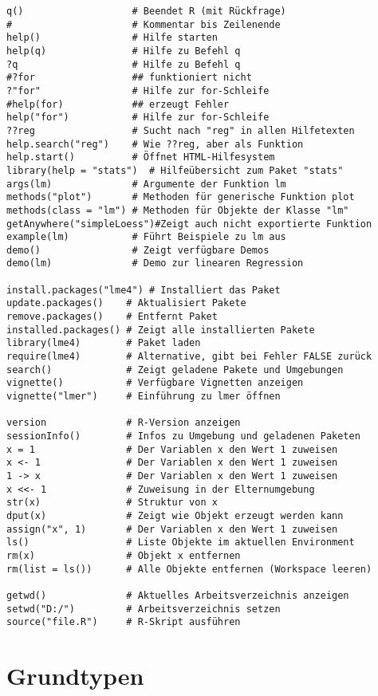 \documentclass[10pt,twocolumn]{scrartcl}
\begin{document}
\begin{lstlisting}
q()                   # Beendet R (mit Rückfrage)
#                     # Kommentar bis Zeilenende
help()                # Hilfe starten
help(q)               # Hilfe zu Befehl q
?q                    # Hilfe zu Befehl q
#?for                 ## funktioniert nicht
?"for"                # Hilfe zur for-Schleife
#help(for)            ## erzeugt Fehler
help("for")           # Hilfe zur for-Schleife
??reg                 # Sucht nach "reg" in allen Hilfetexten
help.search("reg")    # Wie ??reg, aber als Funktion
help.start()          # Öffnet HTML-Hilfesystem
library(help = "stats")  # Hilfeübersicht zum Paket "stats"
args(lm)              # Argumente der Funktion lm
methods("plot")       # Methoden für generische Funktion plot
methods(class = "lm") # Methoden für Objekte der Klasse "lm"
getAnywhere("simpleLoess")#Zeigt auch nicht exportierte Funktion
example(lm)           # Führt Beispiele zu lm aus
demo()                # Zeigt verfügbare Demos
demo(lm)              # Demo zur linearen Regression

install.packages("lme4") # Installiert das Paket
update.packages()    # Aktualisiert Pakete
remove.packages()    # Entfernt Paket
installed.packages() # Zeigt alle installierten Pakete
library(lme4)        # Paket laden
require(lme4)        # Alternative, gibt bei Fehler FALSE zurück
search()             # Zeigt geladene Pakete und Umgebungen
vignette()           # Verfügbare Vignetten anzeigen
vignette("lmer")     # Einführung zu lmer öffnen

version              # R-Version anzeigen
sessionInfo()        # Infos zu Umgebung und geladenen Paketen
x = 1                # Der Variablen x den Wert 1 zuweisen
x <- 1               # Der Variablen x den Wert 1 zuweisen
1 -> x               # Der Variablen x den Wert 1 zuweisen
x <<- 1              # Zuweisung in der Elternumgebung
str(x)               # Struktur von x
dput(x)              # Zeigt wie Objekt erzeugt werden kann
assign("x", 1)       # Der Variablen x den Wert 1 zuweisen
ls()                 # Liste Objekte im aktuellen Environment
rm(x)                # Objekt x entfernen
rm(list = ls())      # Alle Objekte entfernen (Workspace leeren)

getwd()              # Aktuelles Arbeitsverzeichnis anzeigen
setwd("D:/")         # Arbeitsverzeichnis setzen
source("file.R")     # R-Skript ausführen
\end{lstlisting}


\section{Grundtypen}
\end{document}
